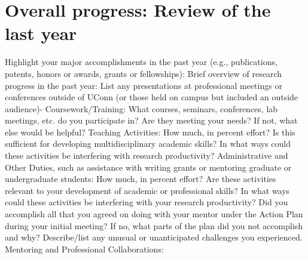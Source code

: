 \documentclass[answers,12pt]{exam}
\begin{document}
\section{Overall progress: Review of the last year}\label{progress}
\begin{questions}
\question
\filbreak Highlight your major accomplishments in the past year (e.g., publications,
patents, honors or awards, grants or fellowships): \tbox[2in]{}
\question
\filbreak Brief overview of research progress in the past year: \tbox[3in]{}
\question
\filbreak List any presentations at professional meetings or conferences outside of
  UConn (or those held on campus but included an outside audience)- \tbox{}
\question
\filbreak Coursework/Training: What courses, seminars, conferences, lab meetings,
  etc. do you participate in? Are they meeting your needs?  If not, what else
  would be helpful?  \tbox{}
\question
\filbreak Teaching Activities: How much, in percent effort? Is this sufficient for
  developing multidisciplinary academic skills? In what ways could these
  activities be interfering with research productivity?  \tbox{}
\question
\filbreak Administrative and Other Duties, such as assistance with writing grants or
  mentoring graduate or undergraduate students: How much, in percent effort?
  Are these activities relevant to your development of academic or professional
  skills?  In what ways could these activities be interfering with your research
  productivity?  \tbox{}
\question
\filbreak Did you accomplish all that you agreed on doing with your mentor under the
  Action Plan during your initial meeting?  If no, what parts of the plan did
  you not accomplish and why? Describe/list any unusual or unanticipated
  challenges you experienced.  \tbox{}
\question Mentoring and Professional Collaborations:
\end{questions}
\end{document}
